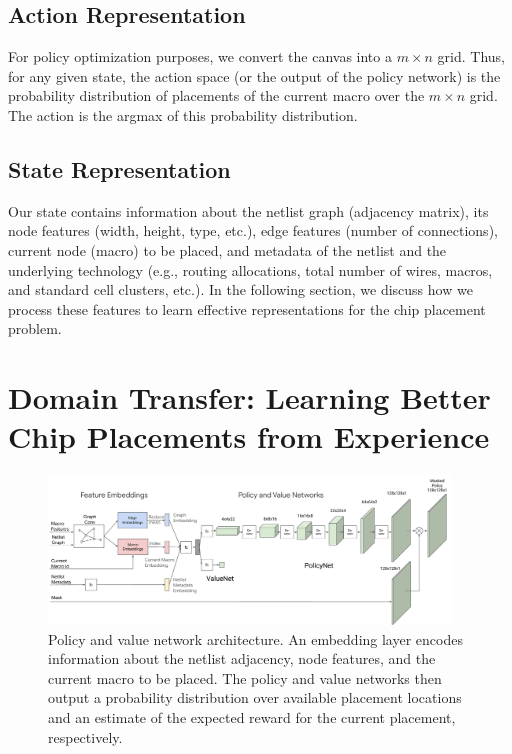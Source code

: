 \documentclass{article}
\begin{document}
\subsection{Action Representation}
\label{section:actions}
For policy optimization purposes, we convert the canvas into a $m\times n$ grid. Thus, for any given state, the action space (or the output of the policy network) is the probability distribution of placements of the current macro over the $m\times n$ grid. The action is the argmax of this probability distribution.

\subsection{State Representation}
\label{section:states}
Our state contains information about the netlist graph (adjacency matrix), its node features (width, height, type, etc.), edge features (number of connections), current node (macro) to be placed, and metadata of the netlist and the underlying technology (e.g., routing allocations, total number of wires, macros, and standard cell clusters, etc.). In the following section, we discuss how we process these features to learn effective representations for the chip placement problem.

\section{Domain Transfer: Learning Better Chip Placements from Experience}
\label{section:domain_transfer}

\begin{figure}
    \centering
    \includegraphics[width=0.95\textwidth]{policy-arch-cropped.pdf}
    \caption{Policy and value network architecture. An embedding layer encodes information about the netlist adjacency, node features, and the current macro to be placed. The policy and value networks then output a probability distribution over available placement locations and an estimate of the expected reward for the current placement, respectively.}
    \label{fig:policy-architecture}
\end{figure}
\end{document}

